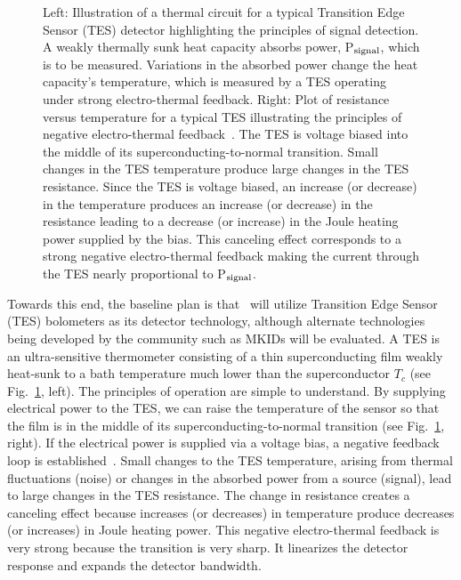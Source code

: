 \begin{figure}[t]
\vskip 0pt
\caption{Left: Illustration of a thermal circuit for a typical
  Transition Edge Sensor (TES) detector highlighting the principles of
  signal detection. A weakly thermally sunk heat capacity absorbs
  power, P$_{\rm signal}$, which is to be measured. Variations in the
  absorbed power change the heat capacity's temperature, which is
  measured by a TES operating under strong electro-thermal
  feedback. Right: Plot of resistance versus temperature for a typical
  TES illustrating the principles of negative electro-thermal
  feedback~\cite{irwin:1998}. The TES is voltage biased into the
  middle of its superconducting-to-normal transition. Small changes in
  the TES temperature produce large changes in the TES
  resistance. Since the TES is voltage biased, an increase (or
  decrease) in the temperature produces an increase (or decrease) in
  the resistance leading to a decrease (or increase) in the Joule
  heating power supplied by the bias. This canceling effect
  corresponds to a strong negative electro-thermal feedback making the
  current through the TES nearly proportional to P$_{\rm signal}$.}
\label{fig:TEScartoon}
\vskip -12pt
\end{figure}


Towards this end, the baseline plan is that \cmbexp\ will utilize Transition Edge Sensor (TES)
bolometers as its detector technology, although alternate technologies being developed
by the community such as MKIDs will be evaluated.  
A TES is an ultra-sensitive thermometer consisting of a thin
superconducting film weakly heat-sunk to a bath temperature much lower
than the superconductor $T_{c}$ (see Fig.~\ref{fig:TEScartoon},
left). The principles of operation are simple to understand. By
supplying electrical power to the TES, we can raise the temperature of
the sensor so that the film is in the middle of its
superconducting-to-normal transition (see Fig.~\ref{fig:TEScartoon},
right). If the electrical power is supplied via a voltage bias, a
negative feedback loop is established~\cite{irwin:1998}. Small changes
to the TES temperature, arising from thermal fluctuations (noise) or
changes in the absorbed power from a source (signal), lead to large
changes in the TES resistance. The change in resistance creates a
canceling effect because increases (or decreases) in temperature
produce decreases (or increases) in Joule heating power. This negative
electro-thermal feedback is very strong because the transition is very
sharp. It linearizes the detector response and expands the detector
bandwidth.

